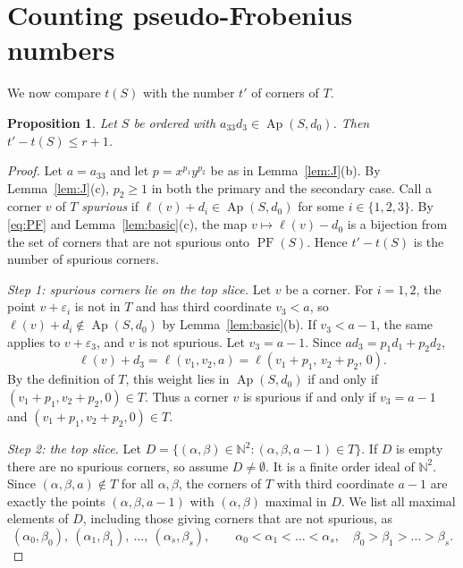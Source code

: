 \documentclass{amsart}
\newtheorem{proposition}[theorem]{Proposition}
\theoremstyle{definition}
\theoremstyle{remark}
\numberwithin{equation}{section}
\newcommand{\N}{\mathbb{N}}
\newcommand{\Ap}{\operatorname{Ap}}
\DeclareMathOperator{\PF}{PF}
\newcommand{\wt}{\ell}
\newcommand{\Apd}{\Ap(S,d_0)}
\begin{document}
\section{Counting pseudo-Frobenius numbers}\label{sec:type}

We now compare $t(S)$ with the number $t'$ of corners of $T$.

\begin{proposition}\label{prop:topslice}
Let $S$ be ordered with $a_{33}d_3\in\Apd$. Then $t'-t(S)\le r+1$.
\end{proposition}

\begin{proof}
Let $a=a_{33}$ and let $p=x^{p_1}y^{p_2}$ be as in Lemma~\ref{lem:J}(b). By Lemma~\ref{lem:J}(c), $p_2\ge1$ in both the primary and the secondary case. Call a corner $v$ of $T$ \emph{spurious} if $\wt(v)+d_i\in\Apd$ for some $i\in\{1,2,3\}$. By \eqref{eq:PF} and Lemma~\ref{lem:basic}(c), the map $v\mapsto\wt(v)-d_0$ is a bijection from the set of corners that are not spurious onto $\PF(S)$. Hence $t'-t(S)$ is the number of spurious corners.

\emph{Step 1: spurious corners lie on the top slice.} Let $v$ be a corner. For $i=1,2$, the point $v+\varepsilon_i$ is not in $T$ and has third coordinate $v_3<a$, so $\wt(v)+d_i\notin\Apd$ by Lemma~\ref{lem:basic}(b). If $v_3<a-1$, the same applies to $v+\varepsilon_3$, and $v$ is not spurious. Let $v_3=a-1$. Since $ad_3=p_1d_1+p_2d_2$,
\[
\wt(v)+d_3=\wt(v_1,v_2,a)=\wt(v_1+p_1,\,v_2+p_2,\,0).
\]
By the definition of $T$, this weight lies in $\Apd$ if and only if $(v_1+p_1,v_2+p_2,0)\in T$. Thus a corner $v$ is spurious if and only if $v_3=a-1$ and $(v_1+p_1,v_2+p_2,0)\in T$.

\emph{Step 2: the top slice.} Let $D=\{(\alpha,\beta)\in\N^2 : (\alpha,\beta,a-1)\in T\}$. If $D$ is empty there are no spurious corners, so assume $D\neq\emptyset$. It is a finite order ideal of $\N^2$. Since $(\alpha,\beta,a)\notin T$ for all $\alpha,\beta$, the corners of $T$ with third coordinate $a-1$ are exactly the points $(\alpha,\beta,a-1)$ with $(\alpha,\beta)$ maximal in $D$. We list all maximal elements of $D$, including those giving corners that are not spurious, as
\[
(\alpha_0,\beta_0),\ (\alpha_1,\beta_1),\ \dots,\ (\alpha_s,\beta_s),\qquad \alpha_0<\alpha_1<\dots<\alpha_s,\quad \beta_0>\beta_1>\dots>\beta_s .
\]


\end{proof}
\end{document}
